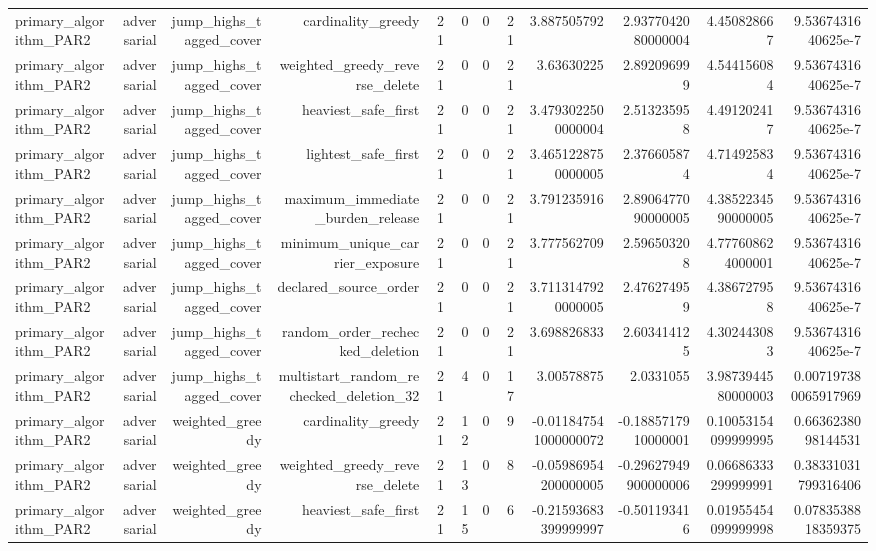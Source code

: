 {\begin{longtable}{lrrrrrrrrrrr}
primary\_algorithm\_PAR2 & adversarial & jump\_highs\_tagged\_cover & cardinality\_greedy & 21 & 0 & 0 & 21 & 3.887505792 & 2.9377042080000004 & 4.450828667 & 9.5367431640625e-7 \\
primary\_algorithm\_PAR2 & adversarial & jump\_highs\_tagged\_cover & weighted\_greedy\_reverse\_delete & 21 & 0 & 0 & 21 & 3.63630225 & 2.892096999 & 4.544156084 & 9.5367431640625e-7 \\
primary\_algorithm\_PAR2 & adversarial & jump\_highs\_tagged\_cover & heaviest\_safe\_first & 21 & 0 & 0 & 21 & 3.4793022500000004 & 2.513235958 & 4.491202417 & 9.5367431640625e-7 \\
primary\_algorithm\_PAR2 & adversarial & jump\_highs\_tagged\_cover & lightest\_safe\_first & 21 & 0 & 0 & 21 & 3.4651228750000005 & 2.376605874 & 4.714925834 & 9.5367431640625e-7 \\
primary\_algorithm\_PAR2 & adversarial & jump\_highs\_tagged\_cover & maximum\_immediate\_burden\_release & 21 & 0 & 0 & 21 & 3.791235916 & 2.8906477090000005 & 4.3852234590000005 & 9.5367431640625e-7 \\
primary\_algorithm\_PAR2 & adversarial & jump\_highs\_tagged\_cover & minimum\_unique\_carrier\_exposure & 21 & 0 & 0 & 21 & 3.777562709 & 2.596503208 & 4.777608624000001 & 9.5367431640625e-7 \\
primary\_algorithm\_PAR2 & adversarial & jump\_highs\_tagged\_cover & declared\_source\_order & 21 & 0 & 0 & 21 & 3.7113147920000005 & 2.476274959 & 4.386727958 & 9.5367431640625e-7 \\
primary\_algorithm\_PAR2 & adversarial & jump\_highs\_tagged\_cover & random\_order\_rechecked\_deletion & 21 & 0 & 0 & 21 & 3.698826833 & 2.603414125 & 4.302443083 & 9.5367431640625e-7 \\
primary\_algorithm\_PAR2 & adversarial & jump\_highs\_tagged\_cover & multistart\_random\_rechecked\_deletion\_32 & 21 & 4 & 0 & 17 & 3.00578875 & 2.0331055 & 3.9873944580000003 & 0.007197380065917969 \\
primary\_algorithm\_PAR2 & adversarial & weighted\_greedy & cardinality\_greedy & 21 & 12 & 0 & 9 & -0.011847541000000072 & -0.1885717910000001 & 0.10053154099999995 & 0.6636238098144531 \\
primary\_algorithm\_PAR2 & adversarial & weighted\_greedy & weighted\_greedy\_reverse\_delete & 21 & 13 & 0 & 8 & -0.05986954200000005 & -0.29627949900000006 & 0.06686333299999991 & 0.38331031799316406 \\
primary\_algorithm\_PAR2 & adversarial & weighted\_greedy & heaviest\_safe\_first & 21 & 15 & 0 & 6 & -0.21593683399999997 & -0.501193416 & 0.01955454099999998 & 0.0783538818359375 \\

\end{longtable}}
